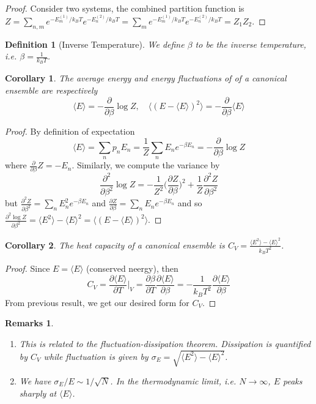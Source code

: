 \documentclass[a4paper]{article}
\newtheorem{remarks}{Remarks}[section]
\theoremstyle{new}
\newtheorem{defi}{Definition}[section]
\newtheorem{cor}{Corollary}[section]
\begin{document}
\begin{proof}
Consider two systems, the combined partition function is $Z=\sum_{n,m}e^{-E_m^{(1)}/k_BT}e^{- E_n^{(2)}/k_BT}=\sum_me^{-E_m^{(1)}/k_BT}e^{-E_n^{(2)}/k_BT}=Z_1Z_2$. 
\end{proof}
\begin{defi}[Inverse Temperature]
We define $\beta$ to be the inverse temperature, i.e. $\beta=\frac{1}{k_BT}$.
\end{defi}
\begin{cor}
The average energy and energy fluctuations of of a canonical ensemble are respectively
\begin{equation}
\langle E\rangle=-\frac{\partial}{\partial\beta}\log Z,\quad\langle (E-\langle E\rangle)^2\rangle=-\frac{\partial}{\partial\beta}\langle E\rangle\label{canonical2}
\end{equation}
\end{cor}
\begin{proof}
By definition of expectation
$$\langle E\rangle=\sum_np_nE_n=\frac{1}{Z}\sum_nE_ne^{-\beta E_n}=-\frac{\partial}{\partial\beta}\log Z$$
where $\frac{\partial}{\partial\beta}Z=-E_n$. Similarly, we compute the variance by
$$\frac{\partial^2}{\partial\beta^2}\log Z=-\frac{1}{Z^2}\bigg(\frac{\partial Z}{\partial\beta}\bigg)^2+\frac{1}{Z}\frac{\partial^2Z}{\partial\beta^2}$$
but $\frac{\partial^2Z}{\partial\beta^2}=\sum_nE_n^2e^{-\beta E_n}$ and $\frac{\partial Z}{\partial\beta}=\sum_nE_ne^{-\beta E_n}$ and so $\frac{\partial^2\log Z}{\partial\beta^2}=\langle E^2\rangle-\langle E\rangle^2=\langle (E-\langle E\rangle)^2\rangle$. 
\end{proof}
\begin{cor}
The heat capacity of a canonical ensemble is $C_V=\frac{\langle E^2\rangle-\langle E\rangle^2}{k_BT^2}$.
\end{cor}
\begin{proof}
Since $E=\langle E\rangle$ (conserved neergy), then
$$C_V=\frac{\partial\langle E\rangle}{\partial T}\bigg|_V=\frac{\partial\beta}{\partial T}\frac{\partial\langle E\rangle}{\partial\beta}=-\frac{1}{k_BT^2}\frac{\partial\langle E\rangle}{\partial\beta}$$
From previous result, we get our desired form for $C_V$.
\end{proof}
\begin{remarks}\leavevmode
\begin{enumerate}
\item This is related to the fluctuation-dissipation theorem. Dissipation is quantified by $C_V$ while fluctuation is given by $\sigma_E=\sqrt{\langle E^2\rangle-\langle E\rangle^2}$.
\item We have $\sigma_E/E\sim1/\sqrt{N}$. In the thermodynamic limit, i.e. $N\rightarrow\infty$, $E$ peaks sharply at $\langle E\rangle$.
\end{enumerate}
\end{remarks}
\end{document}
